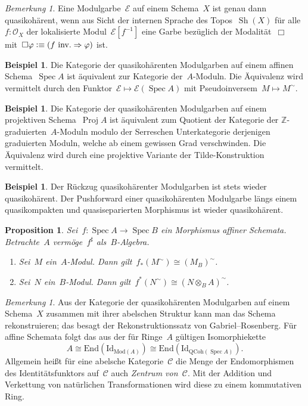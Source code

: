 \documentclass[a4paper,ngerman,12pt]{scrartcl}
\theoremstyle{definition}
\newtheorem{ex}[defn]{Beispiel}
\theoremstyle{plain}
\newtheorem{prop}[defn]{Proposition}
\theoremstyle{remark}
\newtheorem{rem}[defn]{Bemerkung}
\newcommand{\ZZ}{\mathbb{Z}}
\newcommand{\C}{\mathcal{C}}
\newcommand{\E}{\mathcal{E}}
\renewcommand{\O}{\mathcal{O}}
\newcommand{\Sh}{\operatorname{Sh}}
\DeclareMathOperator{\Spec}{Spec}
\DeclareMathOperator{\Proj}{Proj}
\newcommand{\defeqv}{\vcentcolon\equiv}
\begin{document}
\begin{rem}Eine Modulgarbe~$\E$ auf einem Schema~$X$ ist genau dann
quasikohärent, wenn aus Sicht der internen Sprache des Topos~$\Sh(X)$ für
alle~$f : \O_X$ der lokalisierte Modul~$\E[f^{-1}]$ eine Garbe bezüglich der
Modalität~$\Box$ mit~$\Box\varphi \defeqv (\text{$f$ inv.} \Rightarrow
\varphi)$ ist.\end{rem}

\begin{ex}Die Kategorie der quasikohärenten Modulgarben auf einem affinen
Schema~$\Spec A$ ist äquivalent zur Kategorie der~$A$-Moduln. Die Äquivalenz
wird vermittelt durch den Funktor~$\E \mapsto \E(\Spec A)$ mit
Pseudoinversem~$M \mapsto M^\sim$.\end{ex}

\begin{ex}Die Kategorie der quasikohärenten Modulgarben auf einem projektiven
Schema~$\Proj A$ ist äquivalent zum Quotient der Kategorie der
$\ZZ$-graduierten~$A$-Moduln modulo der Serreschen Unterkategorie derjenigen
graduierten Moduln, welche ab einem gewissen Grad verschwinden. Die Äquivalenz
wird durch eine projektive Variante der Tilde-Konstruktion vermittelt.\end{ex}

\begin{ex}Der Rückzug quasikohärenter Modulgarben ist stets wieder
quasikohärent. Der Pushforward einer quasikohärenten Modulgarbe längs einem
quasikompakten und quasiseparierten Morphismus ist wieder
quasikohärent.\end{ex}

\begin{prop}Sei~$f : \Spec A \to \Spec B$ ein Morphismus affiner Schemata.
Betrachte~$A$ vermöge~$f^\sharp$ als~$B$-Algebra.
\begin{enumerate}
\item Sei~$M$ ein~$A$-Modul. Dann gilt~$f_*(M^\sim) \cong (M_B)^\sim$.
\item Sei~$N$ ein~$B$-Modul. Dann gilt~$f^*(N^\sim) \cong (N \otimes_B
A)^\sim$.
\end{enumerate}
\end{prop}

\begin{rem}Aus der Kategorie der quasikohärenten Modulgarben auf einem
Schema~$X$ zusammen mit ihrer abelschen Struktur kann man das Schema
rekonstruieren; das besagt der Rekonstruktionssatz von Gabriel--Rosenberg. Für
affine Schemata folgt das aus der für Ringe~$A$ gültigen Isomorphiekette
\[ A \cong \mathrm{End}(\mathrm{Id}_{\mathrm{Mod}(A)})
  \cong \mathrm{End}(\mathrm{Id}_{\mathrm{QCoh}(\Spec A)}). \]
Allgemein heißt für eine abelsche Kategorie~$\C$ die Menge der Endomorphismen
des Identitätsfunktors auf~$\C$ auch \emph{Zentrum von~$\C$}. Mit der Addition
und Verkettung von natürlichen Transformationen wird diese zu einem
kommutativen Ring.
\end{rem}
\end{document}
